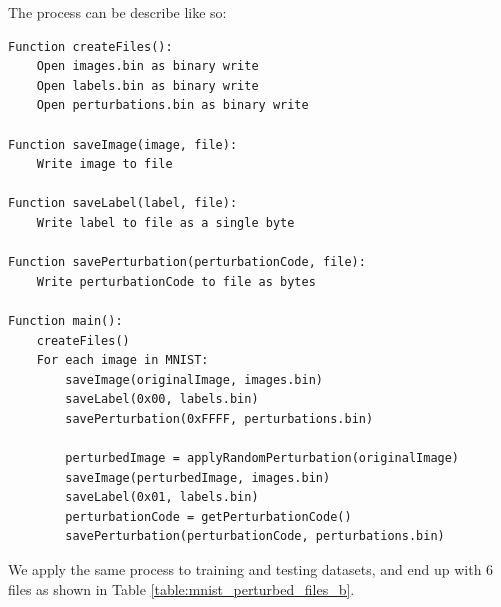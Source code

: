 
The process can be describe like so:

\begin{lstlisting}[caption={MNIST Perturbation Algorithm}, label={lst:mnist_perturbation_algorithm}]
Function createFiles():
    Open images.bin as binary write
    Open labels.bin as binary write
    Open perturbations.bin as binary write

Function saveImage(image, file):
    Write image to file

Function saveLabel(label, file):
    Write label to file as a single byte

Function savePerturbation(perturbationCode, file):
    Write perturbationCode to file as bytes

Function main():
    createFiles()
    For each image in MNIST:
        saveImage(originalImage, images.bin)
        saveLabel(0x00, labels.bin)
        savePerturbation(0xFFFF, perturbations.bin)
        
        perturbedImage = applyRandomPerturbation(originalImage)
        saveImage(perturbedImage, images.bin)
        saveLabel(0x01, labels.bin)
        perturbationCode = getPerturbationCode()
        savePerturbation(perturbationCode, perturbations.bin)

\end{lstlisting}

We apply the same process to training and testing datasets, and end up with 6 files as shown in Table \ref{table:mnist_perturbed_files_b}.


